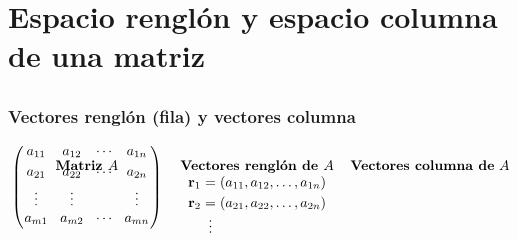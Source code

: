 \section{Espacio renglón y espacio columna de una matriz}

\subsection{}

{\nologo
\begin{frame}\frametitle{Vectores renglón (fila) y vectores columna}

\begin{columns}[c]
	\begin{column}{1.15\textwidth}
		\[
		\begin{array}{@{\hspace{0.1\tabcolsep}}c@{\hspace{2\tabcolsep}}c@{\hspace{2\tabcolsep}}c@{\hspace{0.1\tabcolsep}}}
		\text{\textbf{Matriz }} A & \text{\textbf{Vectores renglón de }} A & \text{\textbf{Vectores columna de} } A \\[-8mm] 
		{\left(
		\begin{array}{@{\hspace{0.1\tabcolsep}}c@{\hspace{1.5\tabcolsep}}c@{\hspace{1.5\tabcolsep}}c@{\hspace{1.5\tabcolsep}}c@{\hspace{0.1\tabcolsep}}}
		a_{11} & a_{12} & \cdots & a_{1n} \\[1mm]
		a_{21} & a_{22} & \cdots & a_{2n} \\[1mm]
		\vdots & \vdots &        & \vdots \\[0mm]
		a_{m1} & a_{m2} & \cdots & a_{mn} \\[1mm]
		\end{array}
		\right)
		\atop		
		}
		& 
		\begin{array}{@{\hspace{0.1\tabcolsep}}c@{\hspace{0.5\tabcolsep}}c@{\hspace{0.5\tabcolsep}}l@{\hspace{0.1\tabcolsep}}}
		\mathbf{r}_1 & = & (a_{11},a_{12},\hdots, a_{1n})\\[1mm]
		\mathbf{r}_2 & = & (a_{21},a_{22},\hdots, a_{2n})\\
		& \vdots & \\[1mm]

\end{array}
\end{array}\]
\end{column}
\end{columns}
\end{frame}}
